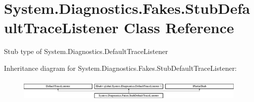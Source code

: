 \hypertarget{class_system_1_1_diagnostics_1_1_fakes_1_1_stub_default_trace_listener}{\section{System.\-Diagnostics.\-Fakes.\-Stub\-Default\-Trace\-Listener Class Reference}
\label{class_system_1_1_diagnostics_1_1_fakes_1_1_stub_default_trace_listener}
}


Stub type of System.\-Diagnostics.\-Default\-Trace\-Listener 


Inheritance diagram for System.\-Diagnostics.\-Fakes.\-Stub\-Default\-Trace\-Listener\-:\begin{figure}[H]
\begin{center}
\leavevmode
\includegraphics[height=1.094819cm]{class_system_1_1_diagnostics_1_1_fakes_1_1_stub_default_trace_listener}
\end{center}
\end{figure}
